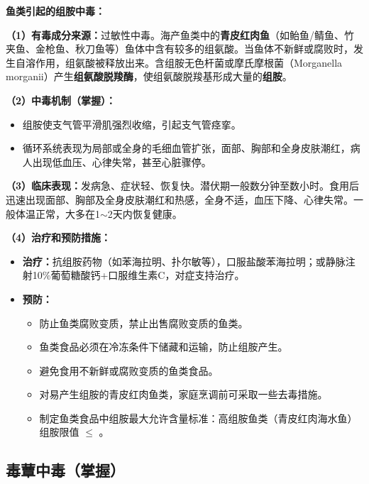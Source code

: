 \begin{keybox}
\textbf{鱼类引起的组胺中毒：}

\textbf{（1）有毒成分来源：}过敏性中毒。海产鱼类中的\textbf{青皮红肉鱼}（如鲐鱼/鲭鱼、竹夹鱼、金枪鱼、秋刀鱼等）鱼体中含有较多的组氨酸。当鱼体不新鲜或腐败时，发生自溶作用，组氨酸被释放出来。含组胺无色杆菌或摩氏摩根菌（Morganella morganii）产生\textbf{组氨酸脱羧酶}，使组氨酸脱羧基形成大量的\textbf{组胺}。

\textbf{（2）中毒机制（掌握）：}
\begin{itemize}[leftmargin=*]
    \item 组胺使支气管平滑肌强烈收缩，引起支气管痉挛。
    \item 循环系统表现为局部或全身的毛细血管扩张，面部、胸部和全身皮肤潮红，病人出现低血压、心律失常，甚至心脏骤停。
\end{itemize}

\textbf{（3）临床表现：}发病急、症状轻、恢复快。潜伏期一般数分钟至数小时。食用后迅速出现面部、胸部及全身皮肤潮红和热感，全身不适，血压下降、心律失常。一般体温正常，大多在1$\sim$2天内恢复健康。

\textbf{（4）治疗和预防措施：}
\begin{itemize}[leftmargin=*]
    \item \textbf{治疗：}抗组胺药物（如苯海拉明、扑尔敏等），口服盐酸苯海拉明；或静脉注射10\%葡萄糖酸钙+口服维生素C，对症支持治疗。
    \item \textbf{预防：}
    \begin{itemize}
        \item 防止鱼类腐败变质，禁止出售腐败变质的鱼类。
        \item 鱼类食品必须在冷冻条件下储藏和运输，防止组胺产生。
        \item 避免食用不新鲜或腐败变质的鱼类食品。
        \item 对易产生组胺的青皮红肉鱼类，家庭烹调前可采取一些去毒措施。
        \item 制定鱼类食品中组胺最大允许含量标准：高组胺鱼类（青皮红肉海水鱼）组胺限值 $\leq$ 。
    \end{itemize}
\end{itemize}
\end{keybox}

\subsection{毒蕈中毒（掌握）}\difficulty

